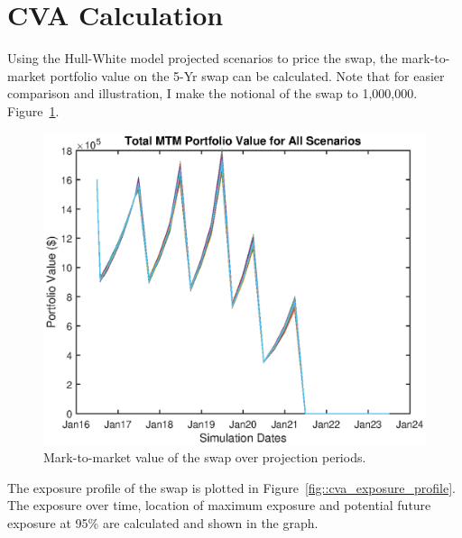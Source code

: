 \section{CVA Calculation}
Using the Hull-White model projected scenarios to price the swap, the mark-to-market portfolio value on the 5-Yr swap can be calculated. Note that for easier comparison and illustration, I make the notional of the swap to 1,000,000. Figure~\ref{fig::cva_mtm_value}.

\begin{center}
  \begin{figure}
  \centering
      \includegraphics[scale=0.6]{cva_mtm_value.eps}
      \caption{Mark-to-market value of the swap over projection periods.}\label{fig::cva_mtm_value}
  \end{figure}
\end{center} 

The exposure profile of the swap is plotted in Figure~\ref{fig::cva_exposure_profile}. The exposure over time, location of maximum exposure and potential future exposure at 95\%  are calculated and shown in the graph. 

